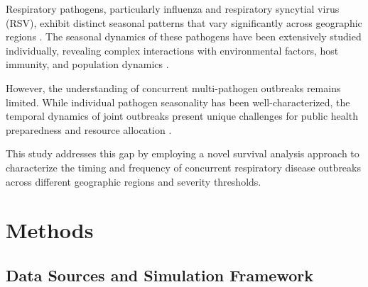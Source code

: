 \documentclass[preprint,12pt]{elsarticle}
\begin{document}

Respiratory pathogens, particularly influenza and respiratory syncytial virus (RSV), exhibit distinct seasonal patterns that vary significantly across geographic regions \citep{smith2023}. The seasonal dynamics of these pathogens have been extensively studied individually, revealing complex interactions with environmental factors, host immunity, and population dynamics \citep{jones2022}.


However, the understanding of concurrent multi-pathogen outbreaks remains limited. While individual pathogen seasonality has been well-characterized, the temporal dynamics of joint outbreaks present unique challenges for public health preparedness and resource allocation \citep{brown2023}.


This study addresses this gap by employing a novel survival analysis approach to characterize the timing and frequency of concurrent respiratory disease outbreaks across different geographic regions and severity thresholds.

\section{Methods}


\subsection{Data Sources and Simulation Framework}

\end{document}
